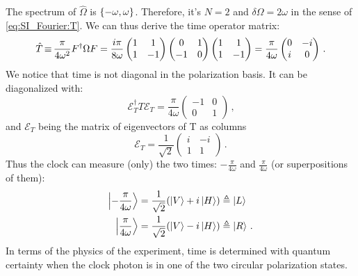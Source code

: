 The spectrum of $\hat{\Omega}$ is $\qty{-\omega, \omega}$.
Therefore, it's $N=2$ and $\delta\Omega = 2\omega$ in the sense of
\eqref{eq:SI_Fourier:T}.
We can thus derive the time operator matrix:
\begin{equation}
  \hat{T}
  \operatorname*{\equiv}
  \frac{\pi}{4\omega^2} F^{\dagger} \Omega F
  =
  \frac{i\pi}{8\omega}
  \begin{pmatrix}
    1 & 1 \\
    1 & -1
  \end{pmatrix}
  \begin{pmatrix}
    0 & 1 \\
   -1 & 0
  \end{pmatrix}
  \begin{pmatrix}
    1 & 1 \\
    1 & -1
  \end{pmatrix}
  =
  \frac{\pi}{4\omega}
  \begin{pmatrix}
    0 & -i \\
    i &  0
  \end{pmatrix}
  \,\text{.}
\end{equation}
We notice that time is not diagonal in the polarization basis.
It can be diagonalized with:
\begin{equation}\label{eq:moreva_diag_T}
  \mathcal{E}_T^{\dagger} T \mathcal{E}_T
  =
\frac{\pi}{4\omega}
\begin{pmatrix}
  -1  & 0 \\
  0   & 1
\end{pmatrix}
\,\text{,}
\end{equation}
and $\mathcal{E}_T$ being the matrix of eigenvectors of T as columns
\begin{equation}
  \mathcal{E}_T
  =
  \frac{1}{\sqrt{2}}
  \begin{pmatrix}
    i & -i \\
    1 & 1
  \end{pmatrix}
  \,\text{.}
\end{equation}
Thus the clock can measure (only) the two times: $-\frac{\pi}{4\omega}$ and $\frac{\pi}{4\omega}$
(or superpositions of them):
\begin{align}
  \ket{-\frac{\pi}{4\omega}} &= \frac{1}{\sqrt{2}} \qty(\ket{V}+i\ket{H}) \triangleq \ket{L} \\
  \ket{ \frac{\pi}{4\omega}} &= \frac{1}{\sqrt{2}} \qty(\ket{V}-i\ket{H}) \triangleq \ket{R} \, \text{.}
\end{align}
In terms of the physics of the experiment,
time is determined with quantum certainty when the clock photon is
in one of the two circular polarization states.

